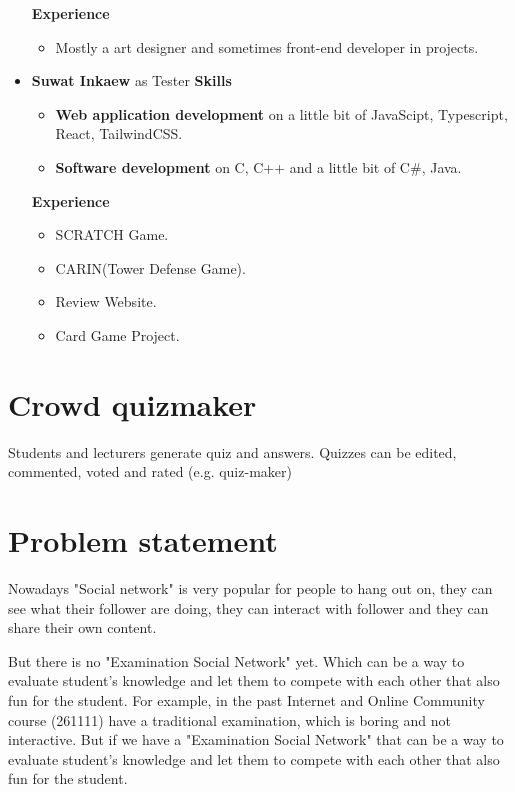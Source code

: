 \documentclass[a4paper, 12pt]{report}
\begin{document}
\begin{itemize}
                \textbf{Experience}
                \begin{itemize}
                    \item Mostly a art designer and sometimes front-end developer in projects. 
                \end{itemize}

            \item \textbf{Suwat Inkaew} as Tester
            \textbf{Skills}
                \begin{itemize}
                    \item \textbf{Web application development} on a little bit of JavaScipt, Typescript, React, TailwindCSS.
                    \item \textbf{Software development} on C, C++ and a little bit of C\#, Java.
                \end{itemize}
                
                \textbf{Experience}
                \begin{itemize}
                    \item SCRATCH Game.
                    \item CARIN(Tower Defense Game).
                    \item Review Website.
                    \item Card Game Project.
                \end{itemize}

        \end{itemize}

    \pagebreak
    \section*{Crowd quizmaker}
    Students and lecturers generate quiz and answers. Quizzes can be edited, commented, voted and rated (e.g. quiz-maker)

    \section*{Problem statement}
    
    Nowadays "Social network" is very popular for people to hang out on, they can see what their follower are doing, they can interact with follower and they can share their own content.

    But there is no "Examination Social Network" yet. Which can be a way to evaluate student's knowledge and let them to compete with each other that also fun for the student. For example, in the past Internet and Online Community course (261111) have a traditional examination, which is boring and not interactive. But if we have a "Examination Social Network" that can be a way to evaluate student's knowledge and let them to compete with each other that also fun for the student.
    
\end{document}
